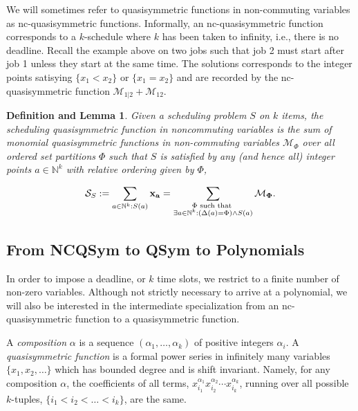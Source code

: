 \documentclass[12pt,reqno]{amsart}
\numberwithin{definition}{section}
\newtheorem{definition_lemma}[definition]{Definition and Lemma}
\theoremstyle{definition}
\newcommand{\NN}{\mathbb{N}}
\newcommand{\ncS}{\mathcal{S}}
\newcommand{\ncM}{\mathcal{M}}
\begin{document}
We will sometimes refer to quasisymmetric functions in non-commuting
variables as nc-quasisymmetric functions.  Informally, an
nc-quasisymmetric function corresponds to a $k$-schedule where $k$ has
been taken to infinity, i.e., there is no deadline.  Recall the example
above on two jobs such that job 2 must start after job 1 unless they
start at the same time.  The solutions corresponds to the integer points satisying $\{x_1 < x_2\}$ or $\{x_1 = x_2\}$ and are recorded by the
nc-quasisymmetric function $\ncM_{1|2} + \ncM_{12}$.

\begin{definition_lemma}
\label{scheduling-ncqsym}
Given a scheduling problem $S$ on $k$ items, the scheduling quasisymmetric function in noncommuting variables is the sum of monomial quasisymmetric functions in non-commuting variables $\ncM_{\Phi}$ over all ordered set partitions ${\Phi}$ such that $S$ is satisfied by any (and hence all) integer points $a \in \mathbb{N}^k$ with relative ordering given by $\Phi$,

$$ \ncS_S := \sum_{a\in\NN^k: S(a)} \bf{x}_a = \sum_{\substack{\Phi \text{ such that } \\ \exists a\in\NN^k: (\Delta(a) =\Phi) \wedge S(a)}} \ncM_{\Phi}.  $$


\end{definition_lemma}





\subsection{From NCQSym to QSym to Polynomials}


 In order to impose a deadline, or $k$ time slots, we restrict to
 a finite number of non-zero variables.
Although not strictly necessary to arrive at a polynomial, we will also be interested in the intermediate specialization from an nc-quasisymmetric function to a quasisymmetric function.  


A \emph{composition} $\alpha$ is a sequence $(\alpha_1,\ldots,\alpha_k)$ of positive integers $\alpha_i$. A \emph{quasisymmetric function} is a formal power series in infinitely many
variables $\{x_1, x_2, \ldots \}$ which has bounded degree and is shift invariant.  Namely, for
any composition $\alpha$, the coefficients of all terms,
$x_{i_1}^{\alpha_1}x_{i_2}^{\alpha_2} \cdots x_{i_k}^{\alpha_k}$,
running over all possible $k$-tuples, $\{i_1 < i_2 < \ldots < i_k \}$, are
the same.
\end{document}
